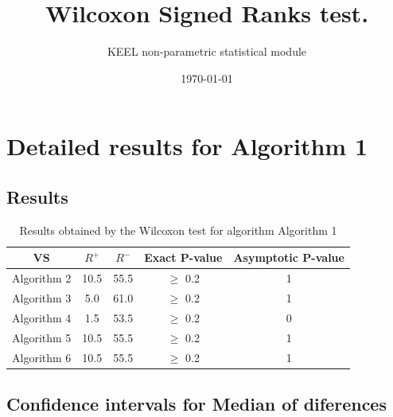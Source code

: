 \documentclass[a4paper,10pt]{article}
\title{Wilcoxon Signed Ranks test.}
\date{\today}
\author{KEEL non-parametric statistical module}
\begin{document}
\pagestyle{empty}
\maketitle
\thispagestyle{empty}



\section{Detailed results for Algorithm 1}


\subsection{Results}

\begin{table}[!htp]
\centering\small
\begin{tabular}{
|c|c|c|c|c|}
\hline
 VS & $R^{+}$ & $R^{-}$ & Exact P-value & Asymptotic P-value \\ \hline 
Algorithm 2 & 10.5 & 55.5 & $\geq$ 0.2 & 1\\ \hline 
Algorithm 3 & 5.0 & 61.0 & $\geq$ 0.2 & 1\\ \hline 
Algorithm 4 & 1.5 & 53.5 & $\geq$ 0.2 & 0\\ \hline 
Algorithm 5 & 10.5 & 55.5 & $\geq$ 0.2 & 1\\ \hline 
Algorithm 6 & 10.5 & 55.5 & $\geq$ 0.2 & 1\\ \hline 

\end{tabular}
\caption{Results obtained by the Wilcoxon test for algorithm Algorithm 1}
\end{table}

\subsection{Confidence intervals for Median of diferences}
\end{document}
